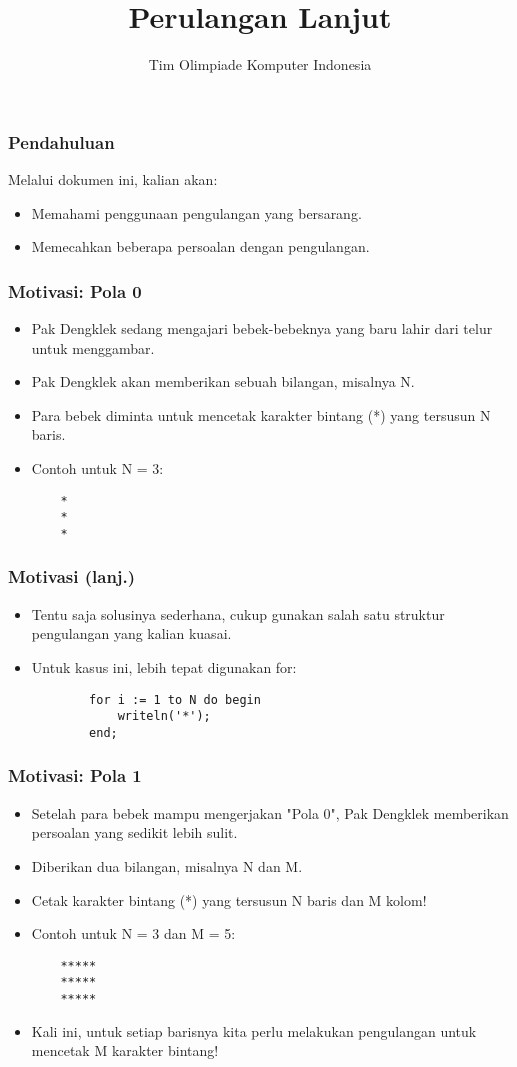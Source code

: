 \documentclass{beamer}
\title{Perulangan Lanjut}
\author{Tim Olimpiade Komputer Indonesia}
\begin{document}
\begin{frame}
\titlepage
\end{frame}

\begin{frame}
\frametitle{Pendahuluan}
Melalui dokumen ini, kalian akan:
\begin{itemize}
	\item Memahami penggunaan pengulangan yang bersarang.
	\item Memecahkan beberapa persoalan dengan pengulangan.
\end{itemize}
\end{frame}

\begin{frame}[fragile]
\frametitle{Motivasi: Pola 0}
\begin{itemize}
	\item Pak Dengklek sedang mengajari bebek-bebeknya yang baru lahir dari telur untuk menggambar.
	\item Pak Dengklek akan memberikan sebuah bilangan, misalnya N.
	\item Para bebek diminta untuk mencetak karakter bintang (*) yang tersusun N baris.
	\item Contoh untuk N = 3:
	\begin{lstlisting}
	*
	*
	*
	\end{lstlisting}
\end{itemize}
\end{frame}

\begin{frame}[fragile]
\frametitle{Motivasi (lanj.)}
\begin{itemize}
	\item Tentu saja solusinya sederhana, cukup gunakan salah satu struktur pengulangan yang kalian kuasai.
	\item Untuk kasus ini, lebih tepat digunakan for:
	\begin{lstlisting}
		for i := 1 to N do begin
		    writeln('*');
		end;
	\end{lstlisting}	
\end{itemize}
\end{frame}

\begin{frame}[fragile]
\frametitle{Motivasi: Pola 1}
\begin{itemize}
	\item Setelah para bebek mampu mengerjakan "Pola 0", Pak Dengklek memberikan persoalan yang sedikit lebih sulit.
	\item Diberikan dua bilangan, misalnya N dan M.
	\item Cetak karakter bintang (*) yang tersusun N baris dan M kolom!
	
	\item Contoh untuk N = 3 dan M = 5:
	\begin{lstlisting}
	*****
	*****
	*****
	\end{lstlisting}
	
	\item Kali ini, untuk setiap barisnya kita perlu melakukan pengulangan untuk mencetak M karakter bintang!
\end{itemize}
\end{frame}
\end{document}
